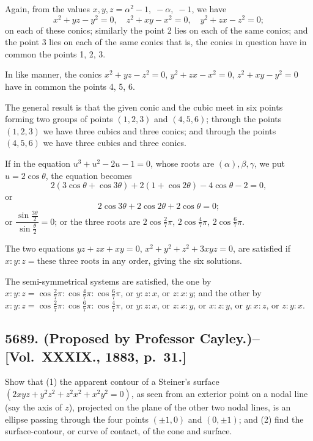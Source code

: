 \documentclass[11pt,a4paper]{book}
\begin{document}
\begin{solution}
Again, from the values $x,y,z = \alpha^2-1, \; -\alpha, \; -1$, we have
\[
x^2+yz-y^2=0, \quad z^2+xy-x^2=0, \quad y^2+zx-z^2=0;
\]
on each of these conics; similarly the point 2 lies on each of the same conics; and the point 3 lies on each of the same conics that is, the conics in question have in common the points 1, 2, 3.

In like manner, the conics $x^2+yz-z^2=0$, $y^2+zx-x^2=0$, $z^2+xy-y^2=0$ have in common the points 4, 5, 6.

The general result is that the given conic and the cubic meet in six points forming two groups of points $(1,2,3)$ and $(4,5,6)$; through the points $(1,2,3)$ we have three cubics and three conics; and through the points $(4,5,6)$ we have three cubics and three conics.

If in the equation $u^3+u^2-2u-1=0$, whose roots are $(\alpha), \beta, \gamma$, we put $u=2\cos\theta$, the equation becomes
\[
2(3\cos\theta+\cos3\theta) + 2(1+\cos2\theta) - 4\cos\theta - 2 = 0,
\]
or
\[
2\cos3\theta + 2\cos2\theta + 2\cos\theta = 0;
\]
or $\dfrac{\sin\frac{3\theta}{2}}{\sin\frac{\theta}{2}} = 0$; or the three roots are $2\cos\frac{2}{7}\pi$, $2\cos\frac{4}{7}\pi$, $2\cos\frac{6}{7}\pi$.

The two equations $yz+zx+xy=0$, $x^2+y^2+z^2+3xyz=0$, are satisfied if $x:y:z = \text{these three roots in any order}$, giving the six solutions.

The semi-symmetrical systems are satisfied, the one by $x:y:z = \cos\frac{2}{7}\pi : \cos\frac{4}{7}\pi : \cos\frac{6}{7}\pi$, or $y:z:x$, or $z:x:y$; and the other by $x:y:z = \cos\frac{2}{7}\pi : \cos\frac{6}{7}\pi : \cos\frac{4}{7}\pi$, or $y:z:x$, or $z:x:y$, or $x:z:y$, or $y:x:z$, or $z:y:x$.
\end{solution}

\newpage

\subsection*{5689. (Proposed by Professor Cayley.)\---[Vol.~XXXIX., 1883, p.~31.]}

Show that (1) the apparent contour of a Steiner's surface $(2xyz+y^2z^2+z^2x^2+x^2y^2=0)$, as seen from an exterior point on a nodal line (say the axis of $z$), projected on the plane of the other two nodal lines, is an ellipse passing through the four points $(\pm1,0)$ and $(0,\pm1)$; and (2) find the surface-contour, or curve of contact, of the cone and surface.
\end{document}
